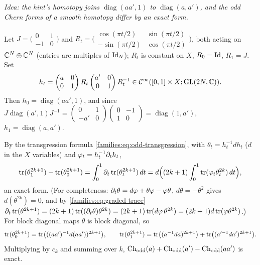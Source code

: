 \subsection*{}
\emph{Idea: the hint's homotopy joins $\operatorname{diag}(aa',1)$ to
$\operatorname{diag}(a,a')$, and the odd Chern forms of a smooth homotopy differ by
an exact form.}

Let $J=\bigl(\begin{smallmatrix}0&1\\-1&0\end{smallmatrix}\bigr)$ and
$R_t=\bigl(\begin{smallmatrix}\cos(\pi t/2)&\sin(\pi t/2)\\-\sin(\pi t/2)&\cos(\pi t/2)
\end{smallmatrix}\bigr)$, both acting on $\mathbb{C}^N\oplus\mathbb{C}^N$ (entries are multiples of
$\operatorname{Id}_N$); $R_t$ is constant on $X$, $R_0=\operatorname{Id}$, $R_1=J$. Set
\begin{equation*}
h_t=\begin{pmatrix}a&0\\0&1\end{pmatrix}R_t\begin{pmatrix}a'&0\\0&1\end{pmatrix}R_t^{-1}
\in\mathcal{C}^\infty([0,1]\times X;\operatorname{GL}(2N,\mathbb{C})).
\end{equation*}
Then $h_0=\operatorname{diag}(aa',1)$, and since
$J\operatorname{diag}(a',1)J^{-1}=\begin{pmatrix}0&1\\-a'&0\end{pmatrix}
\begin{pmatrix}0&-1\\1&0\end{pmatrix}=\operatorname{diag}(1,a')$,
$h_1=\operatorname{diag}(a,a')$.

By the transgression formula \eqref{families:eq:odd-transgression}, with
$\theta_t=h_t^{-1}dh_t$ ($d$ in the $X$ variables) and $\varphi_t=h_t^{-1}\partial_th_t$,
\begin{equation*}
\operatorname{tr}(\theta_1^{2k+1})-\operatorname{tr}(\theta_0^{2k+1})=\int_0^1\partial_t\operatorname{tr}(\theta_t^{2k+1})\,dt
=d\Bigl((2k+1)\int_0^1\operatorname{tr}(\varphi_t\theta_t^{2k})\,dt\Bigr),
\end{equation*}
an exact form. (For completeness: $\partial_t\theta=d\varphi+\theta\varphi-\varphi\theta$,
$d\theta=-\theta^2$ gives $d(\theta^{2k})=0$, and by \eqref{families:eq:graded-trace}
$\partial_t\operatorname{tr}(\theta^{2k+1})=(2k+1)\operatorname{tr}((\partial_t\theta)\theta^{2k})=(2k+1)\operatorname{tr}(d\varphi\,
\theta^{2k})=(2k+1)d\operatorname{tr}(\varphi\theta^{2k})$.) For block diagonal maps $\theta$ is
block diagonal, so
\begin{equation*}
\operatorname{tr}(\theta_0^{2k+1})=\operatorname{tr}\bigl(((aa')^{-1}d(aa'))^{2k+1}\bigr),\qquad
\operatorname{tr}(\theta_1^{2k+1})=\operatorname{tr}\bigl((a^{-1}da)^{2k+1}\bigr)+\operatorname{tr}\bigl((a'^{-1}da')^{2k+1}\bigr).
\end{equation*}
Multiplying by $c_k$ and summing over $k$, $\operatorname{Ch}_{\mathrm{odd}}(a)+\operatorname{Ch}_{\mathrm{odd}}(a')-\operatorname{Ch}_{\mathrm{odd}}(aa')$ is exact.

